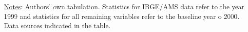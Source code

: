 \begin{table}[H]
\begin{footnotesize}
\begin{center}
{\begin{threeparttable}[b]
    \begin{tablenotes}
  \scriptsize{\underline{Notes}: Authors' own tabulation. Statistics for IBGE/AMS data refer to the year 1999 and statistics for all remaining variables refer to the baseline year o 2000. Data sources indicated in the table.}
  \end{tablenotes}
    



\end{threeparttable}
}
\end{center}
\end{footnotesize}
\end{table}